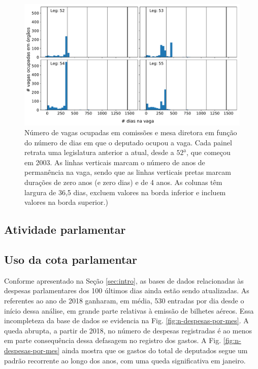 \documentclass[12pt,a4paper]{article}
\newcommand{\HX}[1]{{\centering\color{red}\large<#1>}}
\begin{document}
\begin{figure}[H]
\centering
\includegraphics[width=1.0\textwidth]{graficos/vagas_ocupadas_por_tempo_na_vaga_2019-05-06.pdf}
\caption{Número de vagas ocupadas em comissões e mesa diretora em função do número de dias em que o deputado
  ocupou a vaga. Cada painel retrata uma legislatura anterior a atual, desde a $52^{\mathrm{\underline{a}}}$,
  que começou em 2003. As linhas verticais marcam o número de anos de permanência na vaga, sendo que as linhas
  verticais pretas marcam durações de zero anos (e zero dias) e de 4 anos. As colunas têm largura de 36,5 dias,
  excluem valores na borda inferior e incluem valores na borda superior.)
}
\label{fig:tempo-na-vaga}
\end{figure} 


\HX{Incluir análise histórica da distribuição de cargos}

\subsection{Atividade parlamentar}

\HX{Incluir seção sobre atividade parlamentar na câmara e no senado}

\subsection{Uso da cota parlamentar}

Conforme apresentado na Seção \ref{sec:intro}, as bases de dados relacionadas às despesas parlamentares dos 100 últimos
dias ainda estão sendo atualizadas. As referentes ao ano de 2018 ganharam, em média, 530 entradas por dia desde o início
dessa análise, em grande parte relativas à emissão de bilhetes aéreos. Essa incompleteza da base de dados se evidencia
na Fig. \ref{fig:n-despesas-por-mes}. A queda abrupta, a partir de 2018, no número de despesas registradas é ao menos
em parte consequência dessa defasagem no registro dos gastos. A Fig. \ref{fig:n-despesas-por-mes} ainda mostra que
os gastos do total de deputados segue um padrão recorrente ao longo dos anos, com uma queda significativa em janeiro.
\end{document}
